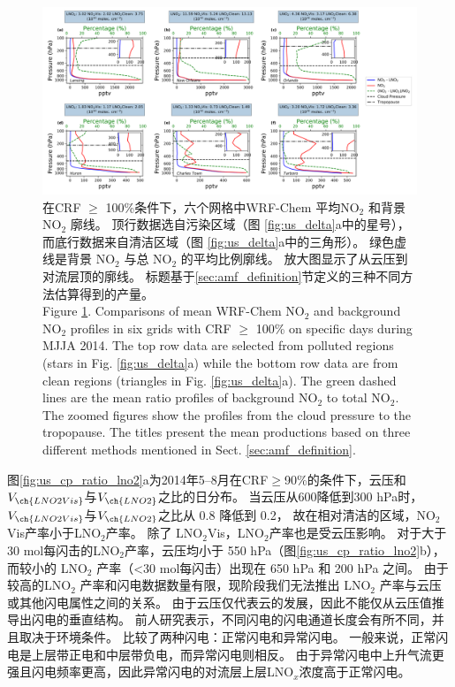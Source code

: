 \begin{figure}
\centering
\includegraphics[width=0.9\columnwidth]{./figures/us_bkgd_comp.png}%
\caption{在CRF $\geq$ 100\%条件下，六个网格中WRF-Chem 平均NO$_\textrm{2}$ 和背景 NO$_\textrm{2}$ 廓线。
顶行数据选自污染区域（图 \ref{fig:us_delta}a中的星号），而底行数据来自清洁区域（图 \ref{fig:us_delta}a中的三角形）。
绿色虚线是背景 NO$_\textrm{2}$ 与总 NO$_\textrm{2}$ 的平均比例廓线。
放大图显示了从云压到对流层顶的廓线。
标题基于\ref{sec:amf_definition}节定义的三种不同方法估算得到的产量。\\
Figure \ref{fig:us_bkgd_comp}. Comparisons of mean WRF-Chem NO$_\textrm{2}$ and background NO$_\textrm{2}$ profiles in six grids with CRF $\geq$ 100\% on specific days during MJJA 2014.
The top row data are selected from polluted regions (stars in Fig. \ref{fig:us_delta}a) while the bottom row data are from clean regions (triangles in Fig. \ref{fig:us_delta}a).
The green dashed lines are the mean ratio profiles of background NO$_\textrm{2}$ to total NO$_\textrm{2}$.
The zoomed figures show the profiles from the cloud pressure to the tropopause.
The titles present the mean productions based on three different methods mentioned in Sect. \ref{sec:amf_definition}.}
\label{fig:us_bkgd_comp}
\end{figure}

图\ref{fig:us_cp_ratio_lno2}a为2014年5--8月在CRF$\geq$90\%的条件下，云压和$V_{\ch{LNO2Vis}}$与$V_{\ch{LNO2}}$之比的日分布。
当云压从600降低到300 hPa时，$V_{\ch{LNO2Vis}}$与$V_{\ch{LNO2}}$之比从 0.8 降低到 0.2，
故在相对清洁的区域，NO$_2$Vis产率小于LNO$_2$产率。
除了 LNO$_2$Vis，LNO$_2$产率也是受云压影响。
对于大于 30 mol每闪击的LNO$_2$产率，云压均小于 550 hPa（图\ref{fig:us_cp_ratio_lno2}b），
而较小的 LNO$_2$ 产率（<30 mol每闪击）出现在 650 hPa 和 200 hPa 之间。
由于较高的LNO$_2$ 产率和闪电数据数量有限，现阶段我们无法推出 LNO$_2$ 产率与云压或其他闪电属性之间的关系。
由于云压仅代表云的发展，因此不能仅从云压值推导出闪电的垂直结构。
前人研究表示，不同闪电的闪电通道长度会有所不同，并且取决于环境条件\citep{Carey.2016,Mecikalski.2017,Fuchs.2018}。
\citet{Davis.2019}比较了两种闪电：正常闪电和异常闪电。
一般来说，正常闪电是上层带正电和中层带负电，而异常闪电则相反\citep{Williams.1989}。
由于异常闪电中上升气流更强且闪电频率更高，因此异常闪电的对流层上层LNO$_x$浓度高于正常闪电。



